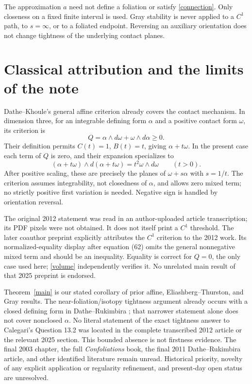 \documentclass[11pt]{article}
\begin{document}
The approximation $a$ need not define a foliation or satisfy
\eqref{connection}. Only closeness on a fixed finite interval is used.
Gray stability is never applied to a $C^1$ path, to $s=\infty$, or
to a foliated endpoint. Reversing an auxiliary orientation does not
change tightness of the underlying contact planes.

\section{Classical attribution and the limits of the note}
Dathe--Khoule's general affine criterion
\cite[Definition 2.1 and Theorem 2.2, pp.~102--103]{DK} already
covers the contact mechanism. In dimension three, for an integrable
defining form $\alpha$ and a positive contact form $\omega$, its
criterion is
\begin{equation}
Q=\alpha\wedge d\omega+\omega\wedge d\alpha\ge0.
\label{DKcriterion}
\end{equation}
Their definition permits $C(t)=1$, $B(t)=t$, giving
$\alpha+t\omega$. In the present case each term of $Q$ is zero,
and their expansion specializes to
\[
(\alpha+t\omega)\wedge d(\alpha+t\omega)
=t^2\omega\wedge d\omega\qquad(t>0).
\]
After positive scaling, these are precisely the planes of
$\omega+s\alpha$ with $s=1/t$. The criterion assumes integrability,
not closedness of $\alpha$, and allows zero mixed term; no strictly
positive first variation is needed. Negative sign is handled by
orientation reversal.

The original 2012 statement was read in an author-uploaded article
transcription; its PDF pixels were not obtained. It does not itself
print a $C^1$ threshold. The later coauthor preprint
\cite[\S6, Theorem 6.2, pp.~32--33]{KMNW} explicitly attributes the
$C^1$ criterion to the 2012 work. Its normalized-equality display
after equation (62) omits the general nonnegative mixed term and
should be an inequality. Equality is correct for $Q=0$, the only
case used here; \eqref{volume} independently verifies it.
No unrelated main result of that 2025 preprint is endorsed.

Theorem~\ref{main} is our stated corollary of prior affine,
Eliashberg--Thurston, and Gray results. The near-foliation/isotopy
tightness argument already occurs with a closed defining form in
Dathe--Rukimbira \cite[Proposition 3.4]{DR}; that narrower statement
alone does not cover nonclosed $\alpha$.
No literal statement of the exact tightness answer to Calegari's
Question 13.2 was located in the complete transcribed 2012 article
or the relevant 2025 section. This bounded absence is not firstness
evidence. The final 2003 chapter, the full \emph{Confoliations} book,
the final 2011 Dathe--Rukimbira article, and other identified literature
remain unread. Historical priority, novelty of any explicit application
or regularity refinement, and present-day open status are unresolved.
\end{document}
